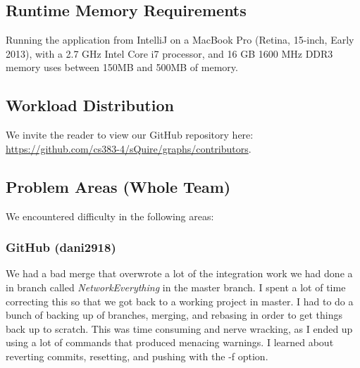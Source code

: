 \documentclass[twoside,letterpaper]{article}
\begin{document}
\subsection{Runtime Memory Requirements}
Running the application from IntelliJ on a MacBook Pro (Retina, 15-inch, Early 2013), with a  2.7 GHz Intel Core i7 processor, and 16 GB 1600 MHz DDR3 memory uses between 150MB and 500MB of memory.

\subsection{Workload Distribution}
We invite the reader to view our GitHub repository here: \url{https://github.com/cs383-4/sQuire/graphs/contributors}.

\subsection{Problem Areas (Whole Team)}
We encountered difficulty in the following areas:
%

\subsubsection{GitHub (dani2918)}
We had a bad merge that overwrote a lot of the integration work we had done a in branch called \textit{NetworkEverything} in the master branch. I spent a lot of time correcting this so that we got back to a working project in master. I had to do a bunch of backing up of branches, merging, and rebasing in order to get things back up to scratch. This was time consuming and nerve wracking, as I ended up using a lot of commands that produced menacing warnings. I learned about reverting commits, resetting, and pushing with the -f option.



\bigskip
\end{document}
